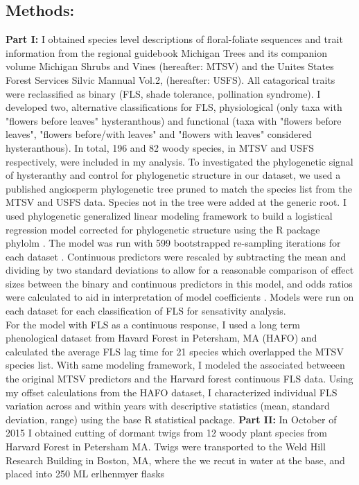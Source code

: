 \documentclass{article}\usepackage[]{graphicx}\usepackage[]{color}
\begin{document}
{{\subsection*{Methods:}
\textbf{Part I:} I obtained species level descriptions of floral-foliate sequences and trait information from the regional guidebook Michigan Trees \citep{Barnes2004} and its companion volume Michigan Shrubs and Vines \citep{Barnes2016} (hereafter: MTSV) and the Unites States Forest Services Silvic Mannual Vol.2, (hereafter: USFS). All catagorical traits were reclassified as binary (FLS, shade tolerance, pollination syndrome). I developed two, alternative classifications for FLS, physiological (only taxa with "flowers before leaves" hysteranthous) and functional (taxa with "flowers before leaves", "flowers before/with leaves" and "flowers with leaves" considered hysteranthous). In total, 196 and 82 woody species, in MTSV and USFS respectively, were included in my analysis. To investigated the phylogenetic signal of hysteranthy and control for phylogenetic structure in our dataset, we used a published angiosperm phylogenetic tree \citep{Zanne2013} pruned to match the species list from the MTSV  and USFS data. Species not in the tree were added at the generic root. I used phylogenetic generalized linear modeling framework \citep{Ives2010} to build a logistical regression model corrected for phylogenetic structure using the R package phylolm \citep{Ho2014}. The model was run with 599 bootstrapped re-sampling iterations for each dataset \citep{Wilcox2000}. Continuous predictors were rescaled by subtracting the mean and dividing by two standard deviations to allow for a reasonable comparison of effect sizes between the binary and continuous predictors in this model, and odds ratios were calculated to aid in interpretation of model coefficients \citep{Gelman2007}. Models were run on each dataset for each classification of FLS for sensativity analysis.\\ 
\indent For the model with FLS as a continuous response, I used a long term phenological dataset from Havard Forest in Petersham, MA (HAFO) \citep{Okeefe} and calculated the average FLS lag time for 21 species which overlapped the MTSV species list. With same modeling framework, I modeled the associated betweeen the original MTSV predictors and the Harvard forest continuous FLS data. Using my offset calculations from the HAFO dataset, I characterized individual FLS variation across and within years with descriptive statistics (mean, standard deviation, range) using the base R statistical package.
\textbf{Part II:} In October of 2015 I obtained cutting of dormant twigs from 12 woody plant species from Harvard Forest in Petersham MA. Twigs were transported to the Weld Hill Research Building in Boston, MA, where the we recut in water at the base, and placed into 250 ML erlhenmyer flasks 


}}
\end{document}
